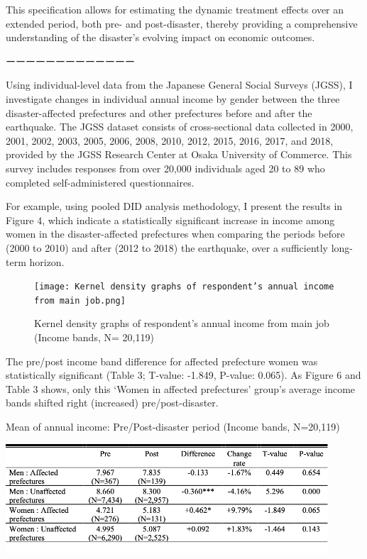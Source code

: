 \documentclass[12pt,halfline,a4paper]{ouparticle}
\begin{document}
This specification allows for estimating the dynamic treatment effects over an extended period, both pre- and post-disaster, thereby providing a comprehensive understanding of the disaster's evolving impact on economic outcomes.

ーーーーーーーーーーーーー

Using individual-level data from the Japanese General Social Surveys (JGSS), I investigate changes in individual annual income by gender between the three disaster-affected prefectures and other prefectures before and after the earthquake. The JGSS dataset consists of cross-sectional data collected in 2000, 2001, 2002, 2003, 2005, 2006, 2008, 2010, 2012, 2015, 2016, 2017, and 2018, provided by the JGSS Research Center at Osaka University of Commerce. This survey includes responses from over 20,000 individuals aged 20 to 89 who completed self-administered questionnaires. 

For example, using pooled DID analysis methodology, I present the results in Figure 4, which indicate a statistically significant increase in income among women in the disaster-affected prefectures when comparing the periods before (2000 to 2010) and after (2012 to 2018) the earthquake, over a sufficiently long-term horizon.


\begin{figure}[h!]
    \centering
    \texttt{[image: Kernel density graphs of respondent’s annual income from main job.png]}  %
    \caption{Kernel density graphs of respondent’s annual income from main job (Income bands, N= 20,119)}
    \label{fig:conceptual_model}
\end{figure}


\newpage

The pre/post income band difference for affected prefecture women was statistically significant (Table 3; T-value: -1.849, P-value: 0.065). As Figure 6 and Table 3 shows, only this ‘Women in affected prefectures’ group's average income bands shifted right (increased) pre/post-disaster.


\begin{table}[h!]
    \centering
    \caption{Mean of annual income: Pre/Post-disaster period (Income bands, N=20,119)}
    \label{tab:annual_income}
    \includegraphics[width=0.9\textwidth]{Annual income table.png}  %
\end{table}
\end{document}
